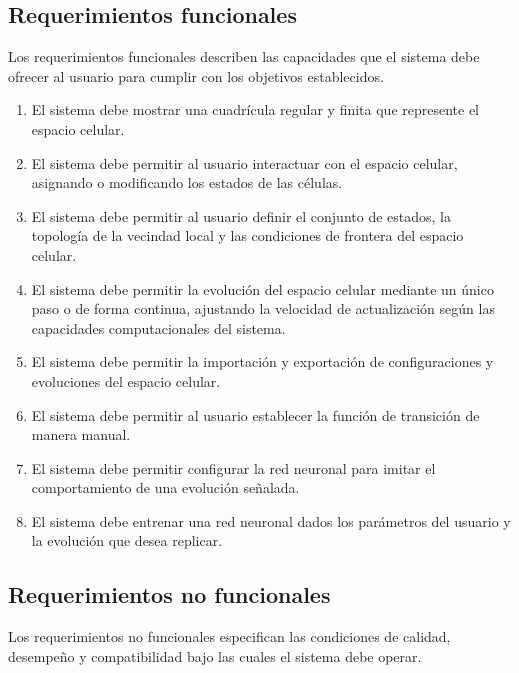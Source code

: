 \subsection{Requerimientos funcionales}

Los requerimientos funcionales describen las capacidades que el sistema debe ofrecer al usuario para cumplir con los objetivos establecidos.

\begin{enumerate}[label=RF\arabic*, noitemsep]
	
	\item El sistema debe mostrar una cuadrícula regular y finita que represente el espacio celular.
	
	\item El sistema debe permitir al usuario interactuar con el espacio celular, asignando o modificando los estados de las células.
	
	\item El sistema debe permitir al usuario definir el conjunto de estados, la topología de la vecindad local y las condiciones de frontera del espacio celular.
	
	\item El sistema debe permitir la evolución del espacio celular mediante un único paso o de forma continua, ajustando la velocidad de actualización según las capacidades computacionales del sistema.
	
	\item El sistema debe permitir la importación y exportación de configuraciones y evoluciones del espacio celular.
	
	\item El sistema debe permitir al usuario establecer la función de transición de manera manual.
	
	\item El sistema debe permitir configurar la red neuronal para imitar el comportamiento de una evolución señalada.
	
	\item El sistema debe entrenar una red neuronal dados los parámetros del usuario y la evolución que desea replicar.
	
\end{enumerate}

\subsection{Requerimientos no funcionales}

Los requerimientos no funcionales especifican las condiciones de calidad, desempeño y compatibilidad bajo las cuales el sistema debe operar.

